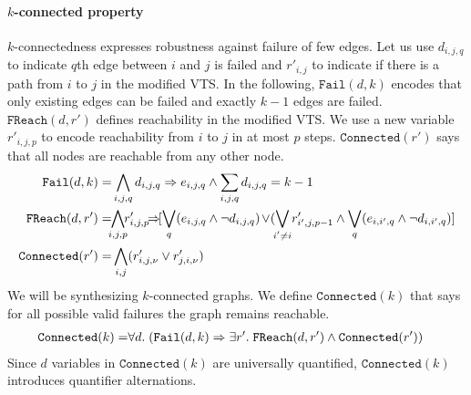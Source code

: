 \paragraph{$k$-connected property}
%
$k$-connectedness expresses robustness against failure of few edges.
%
Let us use $d_{i,j,q}$ to indicate $q$th edge between $i$ and $j$ is failed
and $r'_{i,j}$ to indicate if there is a path from $i$ to $j$ in
the modified VTS.
%
%
In the following, $\texttt{Fail}(d,k)$ encodes that only
existing edges can be failed and exactly $k-1$ edges are failed.
%
$\texttt{FReach}(d,r')$ defines reachability in the modified VTS.
%
We use a new variable $r'_{i,j,p}$ to encode reachability from
$i$ to $j$ in at most $p$ steps.
%
$\texttt{Connected}(r')$ says that all nodes are reachable from any
other node.
\begin{align*}
  \texttt{Fail}(d,k) = & 
  \bigwedge\limits_{i,j,q} d_{i,j,q} \limplies e_{i,j,q}  \land 
  \sum_{i,j,q} d_{i,j,q} = k-1\\
  \texttt{FReach}(d,r') = &\hspace{-1ex}
   \bigwedge\limits_{i,j,p}  \hspace{-1ex}r^{\prime}_{i,j,p} \hspace{-1ex}\limplies\hspace{-1ex} [\bigvee_{q} (e_{i,j,q} \land  \neg d_{i,j,q}) \hspace{-1pt}\lor \hspace{-2pt} (\bigvee_{\mathclap{i' \neq i}}  r^{\prime}_{i',j,p-1} \land  \bigvee_{q} (e_{i,i',q} \land \neg d_{i,i',q}) ]\\
  \texttt{Connected}(r') = & \Land\limits_{i,j} (r^{\prime}_{i,j,\nu} \lor r^{\prime}_{j,i,\nu})
\end{align*}
We will be synthesizing $k$-connected graphs.
%
We define $\texttt{Connected}(k)$ that says for all possible valid failures
the graph remains reachable. 
\begin{align*}
  \texttt{Connected}(k) = & \forall d.\;
          (\texttt{Fail}(d,k) \Rightarrow \exists r'.\;\texttt{FReach}(d,r')
                                \land \texttt{Connected}(r'))
\end{align*}
Since $d$ variables in $\texttt{Connected}(k)$ are universally
quantified, $\texttt{Connected}(k)$ introduces quantifier alternations.
%




